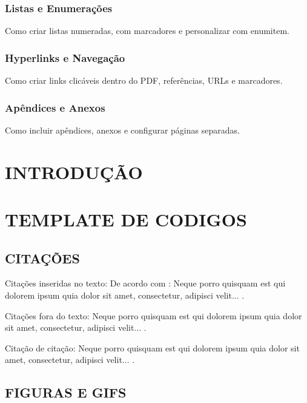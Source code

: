 \subsubsection{Listas e Enumerações}
Como criar listas numeradas, com marcadores e personalizar com enumitem.

\subsubsection{Hyperlinks e Navegação}
Como criar links clicáveis dentro do PDF, referências, URLs e marcadores.

\subsubsection{Apêndices e Anexos}
Como incluir apêndices, anexos e configurar páginas separadas.

\section{INTRODUÇÃO}

\section{TEMPLATE DE CODIGOS} 
\newcommand{\dummytext}{Neque porro quisquam est qui dolorem ipsum quia dolor sit amet, consectetur, adipisci velit... }

\subsection{CITAÇÕES}

Citações inseridas no texto: De acordo com \textcite{exemplo}: \dummytext.

Citações fora do texto: \dummytext \cite{exemplo}.

Citação de citação: \dummytext {}.

\subsection{FIGURAS E GIFS}

